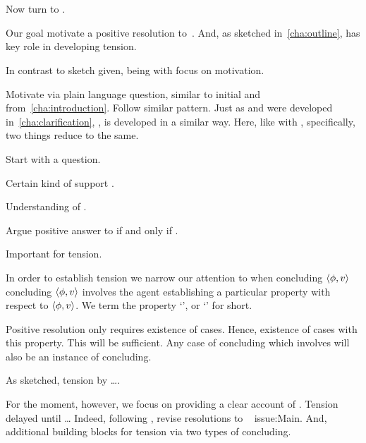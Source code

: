 \chapter{}
\label{cha:zS}

\begin{note}
  Now turn to \zSN{}.

  Our goal motivate a positive resolution to~\issueConstraint{}.
  And, as sketched in~\autoref{cha:outline}, \zSN{} has key role in developing tension.

  In contrast to sketch given, being with focus on motivation.

  Motivate \zSN{} via plain language question, similar to initial \qWhy{} and \qHow{} from~\autoref{cha:introduction}.
  Follow similar pattern.
  Just as \qWhy{} and \qHow{} were developed in~\autoref{cha:clarification}, \zSN{}, is developed in a similar way.
  Here, like with \qWhy{}, specifically, two things reduce to the same.
\end{note}

\begin{note}[Map]
  Start with a question.

  Certain kind of support \zSN{}.

  Understanding of \zSN{}.

  Argue positive answer to \qzS{} if and only if \zSN{}.

  Important for tension.
\end{note}

\begin{note}
  In order to establish tension we narrow our attention to when concluding \(\langle \phi, v \rangle\) concluding \(\langle \phi, v \rangle\) involves the agent establishing a particular property with respect to \(\langle \phi, v \rangle\).
  We term the property `', or `\zS{}' for short.

  Positive resolution only requires existence of cases.
  Hence, existence of cases with this property.
  This will be sufficient.
  Any case of concluding which involves \csVImp{} will also be an instance of concluding.

  As sketched, tension by {\color{red} \dots}.

  For the moment, however, we focus on providing a clear account of \csN{}.
  Tension delayed until \dots
  Indeed, following \csN{}, revise resolutions to ~{\color{red} issue:Main}.
  And, additional building blocks for tension via two types of concluding.
\end{note}


